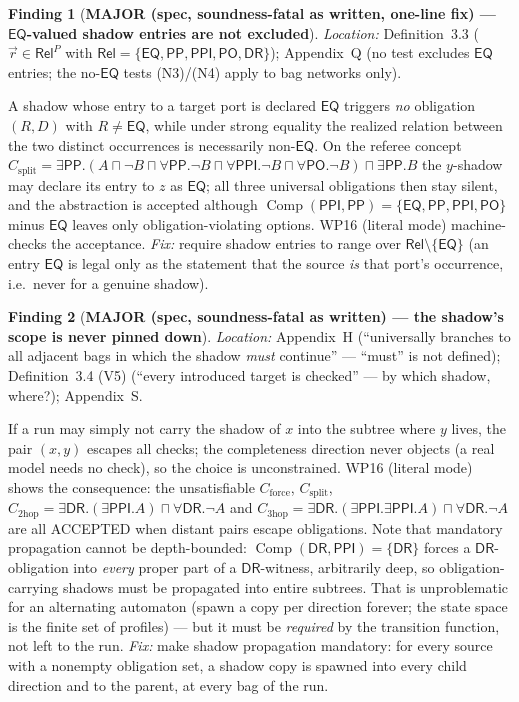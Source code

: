 \documentclass[11pt]{article}
\theoremstyle{definition}
\newtheorem{finding}{Finding}
\newcommand{\EQ}{\mathsf{EQ}}
\newcommand{\PP}{\mathsf{PP}}
\newcommand{\PPI}{\mathsf{PPI}}
\newcommand{\PO}{\mathsf{PO}}
\newcommand{\DR}{\mathsf{DR}}
\newcommand{\Rel}{\mathsf{Rel}}
\newcommand{\Comp}{\operatorname{Comp}}
\begin{document}
\begin{finding}[\textbf{MAJOR (spec, soundness-fatal as written, one-line
fix) --- $\EQ$-valued shadow entries are not excluded}]\label{f:eq}
\emph{Location:} Definition~3.3 ($\vec r\in\Rel^P$ with
$\Rel=\{\EQ,\PP,\PPI,\PO,\DR\}$); Appendix~Q (no test excludes $\EQ$
entries; the no-$\EQ$ tests (N3)/(N4) apply to bag networks only).

A shadow whose entry to a target port is declared $\EQ$ triggers \emph{no}
obligation $(R,D)$ with $R\neq\EQ$, while under strong equality the realized
relation between the two distinct occurrences is necessarily non-$\EQ$.  On
the referee concept
$C_{\mathrm{split}}=\exists\PP.(A\sqcap\lnot B\sqcap\forall\PP.\lnot
B\sqcap\forall\PPI.\lnot B\sqcap\forall\PO.\lnot B)\sqcap\exists\PP.B$
the $y$-shadow may declare its entry to $z$ as $\EQ$; all three universal
obligations then stay silent, and the abstraction is accepted although
$\Comp(\PPI,\PP)=\{\EQ,\PP,\PPI,\PO\}$ minus $\EQ$ leaves only
obligation-violating options.  WP16 (literal mode) machine-checks the
acceptance.  \emph{Fix:} require shadow entries to range over
$\Rel\setminus\{\EQ\}$ (an entry $\EQ$ is legal only as the statement that
the source \emph{is} that port's occurrence, i.e.\ never for a genuine
shadow).
\end{finding}

\begin{finding}[\textbf{MAJOR (spec, soundness-fatal as written) --- the
shadow's scope is never pinned down}]\label{f:scope}
\emph{Location:} Appendix~H (``universally branches to all adjacent bags in
which the shadow \emph{must} continue'' --- ``must'' is not defined);
Definition~3.4 (V5) (``every introduced target is checked'' --- by which
shadow, where?); Appendix~S.

If a run may simply not carry the shadow of $x$ into the subtree where $y$
lives, the pair $(x,y)$ escapes all checks; the completeness direction never
objects (a real model needs no check), so the choice is unconstrained.
WP16 (literal mode) shows the consequence: the unsatisfiable
$C_{\mathrm{force}}$, $C_{\mathrm{split}}$,
$C_{\mathrm{2hop}}=\exists\DR.(\exists\PPI.A)\sqcap\forall\DR.\lnot A$ and
$C_{\mathrm{3hop}}=\exists\DR.(\exists\PPI.\exists\PPI.A)\sqcap
\forall\DR.\lnot A$ are all ACCEPTED when distant pairs escape obligations.
Note that mandatory propagation cannot be depth-bounded:
$\Comp(\DR,\PPI)=\{\DR\}$ forces a $\DR$-obligation into \emph{every}
proper part of a $\DR$-witness, arbitrarily deep, so obligation-carrying
shadows must be propagated into entire subtrees.  That is unproblematic for
an alternating automaton (spawn a copy per direction forever; the state
space is the finite set of profiles) --- but it must be \emph{required} by
the transition function, not left to the run.  \emph{Fix:} make shadow
propagation mandatory: for every source with a nonempty obligation set, a
shadow copy is spawned into every child direction and to the parent, at
every bag of the run.
\end{finding}
\end{document}
